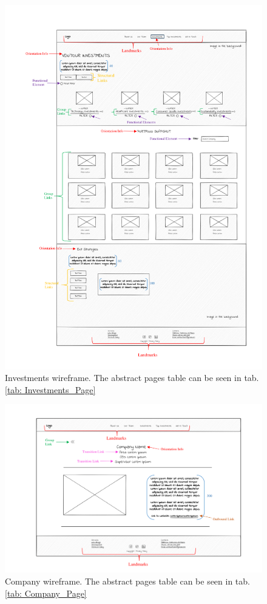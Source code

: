 \begin{figure}
    \centering
    \includegraphics[width=\textwidth]{Images/Wireframes/Investments Wireframe.png}
    \caption{Investments wireframe. The abstract pages table can be seen in tab. \ref{tab: Investments_Page}}
    \label{fig: InvestmentsWireframe}
\end{figure}

\begin{figure}
    \centering
    \includegraphics[width=\textwidth]{Images/Wireframes/company wireframee.png}
    \caption{Company wireframe. The abstract pages table can be seen in tab. \ref{tab: Company_Page}}
    \label{fig: Companywireframe}
\end{figure}

